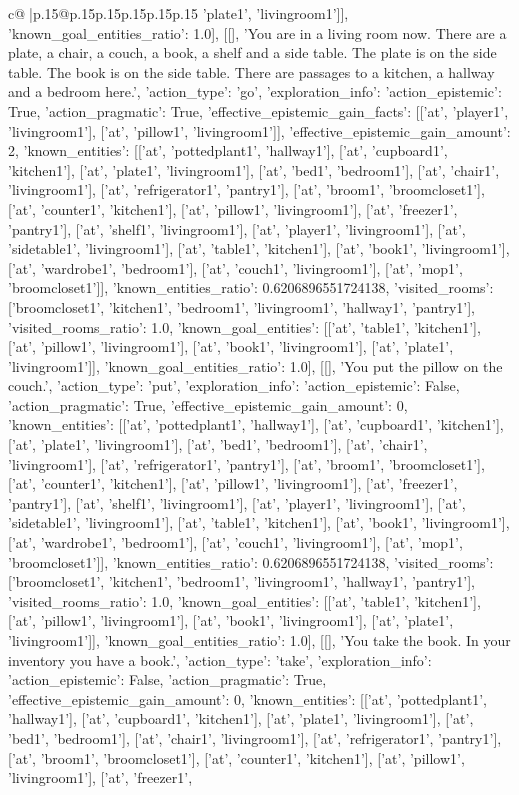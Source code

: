 \documentclass{article}
\begin{document}
{\begin{supertabular}{c@{$\;$}|p{.15\linewidth}@{}p{.15\linewidth}p{.15\linewidth}p{.15\linewidth}p{.15\linewidth}p{.15\linewidth}}
{{{'plate1', 'livingroom1']], 'known_goal_entities_ratio': 1.0}}], [[], 'You are in a living room now. There are a plate, a chair, a couch, a book, a shelf and a side table. The plate is on the side table. The book is on the side table. There are passages to a kitchen, a hallway and a bedroom here.', {'action_type': 'go', 'exploration_info': {'action_epistemic': True, 'action_pragmatic': True, 'effective_epistemic_gain_facts': [['at', 'player1', 'livingroom1'], ['at', 'pillow1', 'livingroom1']], 'effective_epistemic_gain_amount': 2, 'known_entities': [['at', 'pottedplant1', 'hallway1'], ['at', 'cupboard1', 'kitchen1'], ['at', 'plate1', 'livingroom1'], ['at', 'bed1', 'bedroom1'], ['at', 'chair1', 'livingroom1'], ['at', 'refrigerator1', 'pantry1'], ['at', 'broom1', 'broomcloset1'], ['at', 'counter1', 'kitchen1'], ['at', 'pillow1', 'livingroom1'], ['at', 'freezer1', 'pantry1'], ['at', 'shelf1', 'livingroom1'], ['at', 'player1', 'livingroom1'], ['at', 'sidetable1', 'livingroom1'], ['at', 'table1', 'kitchen1'], ['at', 'book1', 'livingroom1'], ['at', 'wardrobe1', 'bedroom1'], ['at', 'couch1', 'livingroom1'], ['at', 'mop1', 'broomcloset1']], 'known_entities_ratio': 0.6206896551724138, 'visited_rooms': ['broomcloset1', 'kitchen1', 'bedroom1', 'livingroom1', 'hallway1', 'pantry1'], 'visited_rooms_ratio': 1.0, 'known_goal_entities': [['at', 'table1', 'kitchen1'], ['at', 'pillow1', 'livingroom1'], ['at', 'book1', 'livingroom1'], ['at', 'plate1', 'livingroom1']], 'known_goal_entities_ratio': 1.0}}], [[], 'You put the pillow on the couch.', {'action_type': 'put', 'exploration_info': {'action_epistemic': False, 'action_pragmatic': True, 'effective_epistemic_gain_amount': 0, 'known_entities': [['at', 'pottedplant1', 'hallway1'], ['at', 'cupboard1', 'kitchen1'], ['at', 'plate1', 'livingroom1'], ['at', 'bed1', 'bedroom1'], ['at', 'chair1', 'livingroom1'], ['at', 'refrigerator1', 'pantry1'], ['at', 'broom1', 'broomcloset1'], ['at', 'counter1', 'kitchen1'], ['at', 'pillow1', 'livingroom1'], ['at', 'freezer1', 'pantry1'], ['at', 'shelf1', 'livingroom1'], ['at', 'player1', 'livingroom1'], ['at', 'sidetable1', 'livingroom1'], ['at', 'table1', 'kitchen1'], ['at', 'book1', 'livingroom1'], ['at', 'wardrobe1', 'bedroom1'], ['at', 'couch1', 'livingroom1'], ['at', 'mop1', 'broomcloset1']], 'known_entities_ratio': 0.6206896551724138, 'visited_rooms': ['broomcloset1', 'kitchen1', 'bedroom1', 'livingroom1', 'hallway1', 'pantry1'], 'visited_rooms_ratio': 1.0, 'known_goal_entities': [['at', 'table1', 'kitchen1'], ['at', 'pillow1', 'livingroom1'], ['at', 'book1', 'livingroom1'], ['at', 'plate1', 'livingroom1']], 'known_goal_entities_ratio': 1.0}}], [[], 'You take the book. In your inventory you have a book.', {'action_type': 'take', 'exploration_info': {'action_epistemic': False, 'action_pragmatic': True, 'effective_epistemic_gain_amount': 0, 'known_entities': [['at', 'pottedplant1', 'hallway1'], ['at', 'cupboard1', 'kitchen1'], ['at', 'plate1', 'livingroom1'], ['at', 'bed1', 'bedroom1'], ['at', 'chair1', 'livingroom1'], ['at', 'refrigerator1', 'pantry1'], ['at', 'broom1', 'broomcloset1'], ['at', 'counter1', 'kitchen1'], ['at', 'pillow1', 'livingroom1'], ['at', 'freezer1', }}}
\end{supertabular}}
\end{document}
